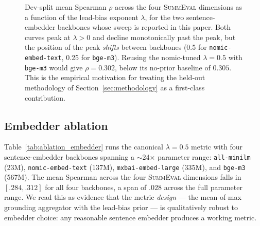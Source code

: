 \documentclass[journal]{IEEEtran}
\begin{document}


\begin{figure}[t]
\centering
{}
\caption{Dev-split mean Spearman $\rho$ across the four
\textsc{SummEval} dimensions as a function of the lead-bias
exponent $\lambda$, for the two sentence-embedder backbones whose
sweep is reported in this paper. Both curves peak at $\lambda>0$
and decline monotonically past the peak, but the position of the
peak \emph{shifts} between backbones (0.5 for
\texttt{nomic-embed-text}, 0.25 for \texttt{bge-m3}). Reusing the
nomic-tuned $\lambda{=}0.5$ with \texttt{bge-m3} would give
$\rho{=}0.302$, below its no-prior baseline of $0.305$. This is
the empirical motivation for treating the held-out methodology of
Section~\ref{sec:methodology} as a first-class contribution.}
\label{fig:lambda-curve}
\end{figure}

\subsection{Embedder ablation}
\label{sec:ablation-embedder}
Table~\ref{tab:ablation_embedder} runs the canonical
$\lambda{=}0.5$ metric with four sentence-embedder backbones
spanning a $\sim$24$\times$ parameter range:
\texttt{all-minilm} (23M),
\texttt{nomic-embed-text} (137M),
\texttt{mxbai-embed-large} (335M), and
\texttt{bge-m3} (567M). The mean Spearman across the four
\textsc{SummEval} dimensions falls in $[.284, .312]$ for all four
backbones, a span of $.028$ across the full parameter range. We
read this as evidence that the metric \emph{design}
--- the mean-of-max grounding aggregator with the lead-bias prior
--- is qualitatively robust to embedder choice: any reasonable
sentence embedder produces a working metric.
\end{document}
